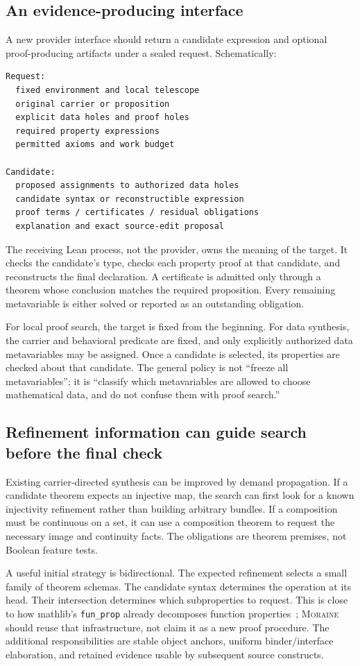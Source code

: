 \documentclass[11pt,letterpaper]{article}
\newcommand{\code}[1]{\nolinkurl{#1}}
\newcommand{\moraine}{\textsc{Moraine}}
\theoremstyle{definition}
\theoremstyle{remark}
\begin{document}
\subsection{An evidence-producing interface}
A new provider interface should return a candidate expression and optional
proof-producing artifacts under a sealed request. Schematically:
\begin{lstlisting}
Request:
  fixed environment and local telescope
  original carrier or proposition
  explicit data holes and proof holes
  required property expressions
  permitted axioms and work budget

Candidate:
  proposed assignments to authorized data holes
  candidate syntax or reconstructible expression
  proof terms / certificates / residual obligations
  explanation and exact source-edit proposal
\end{lstlisting}
The receiving Lean process, not the provider, owns the meaning of the target.
It checks the candidate's type, checks each property proof at that candidate,
and reconstructs the final declaration. A certificate is admitted only through
a theorem whose conclusion matches the required proposition. Every remaining
metavariable is either solved or reported as an outstanding obligation.

For local proof search, the target is fixed from the beginning. For data
synthesis, the carrier and behavioral predicate are fixed, and only explicitly
authorized data metavariables may be assigned. Once a candidate is selected, its
properties are checked about that candidate. The general policy is not ``freeze
all metavariables''; it is ``classify which metavariables are allowed to choose
mathematical data, and do not confuse them with proof search.''

\subsection{Refinement information can guide search before the final check}
Existing carrier-directed synthesis can be improved by demand propagation. If a
candidate theorem expects an injective map, the search can first look for a
known injectivity refinement rather than building arbitrary bundles. If a
composition must be continuous on a set, it can use a composition theorem to
request the necessary image and continuity facts. The obligations are theorem
premises, not Boolean feature tests.

A useful initial strategy is bidirectional. The expected refinement selects a
small family of theorem schemas. The candidate syntax determines the operation
at its head. Their intersection determines which subproperties to request.
This is close to how mathlib's \code{fun_prop} already decomposes function
properties~\cite{FunProp}; \moraine{} should reuse that infrastructure, not claim
it as a new proof procedure. The additional responsibilities are stable object
anchors, uniform binder/interface elaboration, and retained evidence usable by
subsequent source constructs.
\end{document}
